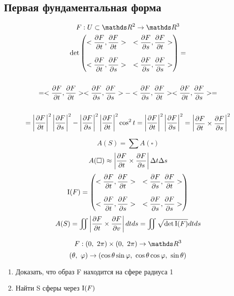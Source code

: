 \documentclass[main]{subfiles}
\begin{document}
    \subsection{Первая фундаментальная форма}

    \begin{Example}
      \[F: U \subset \R^2 \ra \R^3\]
      \begin{multline*}
        $$\det \begin{pmatrix}
          <\dfrac{\d F}{\d t}, \dfrac{\d F}{\d t}> & <\dfrac{\d F}{\d s}, \dfrac{\d F}{\d t}>\\
          \\
          <\dfrac{\d F}{\d t}, \dfrac{\d F}{\d s}> & <\dfrac{\d F}{\d s}, \dfrac{\d F}{\d s}>
        \end{pmatrix} = \\ \\
          = <\frac{\d F}{\d t}, \frac{\d F}{\d t}> <\frac{\d F}{\d s}, \frac{\d F}{\d s}> - <\frac{\d F}{\d s}, \frac{\d F}{\d t}> <\frac{\d F}{\d t}, \dfrac{\d F}{\d s}> =\\ \\
         =\abs{\dfrac{\d F}{\d t}}^2 \abs{\dfrac{\d F}{\d s}}^2 - \abs{\dfrac{\d F}{\d s}}^2 \abs{\dfrac{\d F}{\d t}}^2 \cos^2 t = \abs{\dfrac{\d F}{\d t}}^2 \abs{\dfrac{\d F}{\d s}}^2
        =
        \begin{vmatrix}
          \dfrac{\d F}{\d t} \times \dfrac{\d F}{\d s}
        \end{vmatrix}^2$$
      \end{multline*}
    \end{Example}

    \begin{Remark}
      \[A(S)=\sum A(\square)\]
      \[A(\square) \approx \left|\dfrac{\partial F}{\partial t} \times \dfrac{\partial F}{\partial s}\right| \Delta t \Delta s\]
      \[\RNumb{1}(F)= \begin{pmatrix}
        <\dfrac{\d F}{\d t}, \dfrac{\d F}{\d t}> & <\dfrac{\d F}{\d s}, \dfrac{\d F}{\d t}>\\
        \\
        <\dfrac{\d F}{\d t}, \dfrac{\d F}{\d s}> & <\dfrac{\d F}{\d s}, \dfrac{\d F}{\d s}>
      \end{pmatrix}\]
      \[A(S)= \iint \abs{\dfrac{\d F}{\d t} \times \dfrac{\d F}{\d v}} dt ds = \iint \sqrt{\det \RNumb{1}(F)} dt ds\]
    \end{Remark}

    \begin{Example}
      \[F: (0,\ 2\pi) \times (0,\ 2\pi) \ra \R^3\]
      \[(\theta,\ \varphi) \rightarrow (\cos \theta \sin \varphi,\ \cos \theta \cos \varphi,\ \sin \theta)\]
      \begin{enumerate}
        \item Доказать, что образ F находится на сфере радиуса 1
        \item Найти S сферы через $\RNumb{1}(F)$
      \end{enumerate}
    \end{Example}
\end{document}
